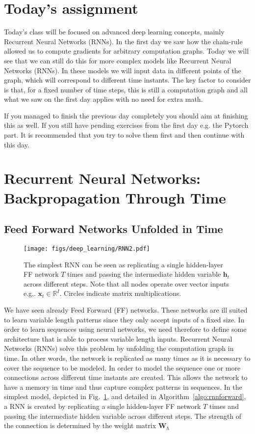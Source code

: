 \section{Today's assignment}
Today's class will be focused on advanced deep learning concepts, mainly
Recurrent Neural Networks (RNNs). In the first day we saw how the chain-rule
allowed us to compute gradients for arbitrary computation graphs. Today we will
see that we can still do this for more complex models like Recurrent Neural
Networks (RNNs). In these models we will input data in different points of the
graph, which will correspond to different time instants. The key factor to
consider is that, for a fixed number of time steps, this is still a computation
graph and all what we saw on the first day applies with no need for extra math.

If you managed to finish the previous day completely you should aim at finishing
this as well. If you still have pending exercises from the first day e.g. the
Pytorch part. It is recommended that you try to solve them first and then
continue with this day. 

\section{Recurrent Neural Networks: Backpropagation Through Time}

\subsection{Feed Forward Networks Unfolded in Time}

\begin{figure}[!h]
\centering
\texttt{[image: figs/deep\_learning/RNN2.pdf]}
\caption{The simplest RNN can be seen as replicating a single hidden-layer FF
network $T$ times and passing the intermediate hidden variable $\mathbf{h}_t$
across different steps. Note that all nodes operate over vector inputs e.g,.
$\mathbf{x}_t \in \mathbb{R}^I$. Circles indicate matrix multiplications.}
\label{fig:RNN}
\end{figure}

We have seen already Feed Forward (FF) networks. These networks are ill
suited to learn variable length patterns since they only accept inputs of a
fixed size. In order to learn sequences using neural networks, we need therefore
to define some architecture that is able to process variable length inputs.
Recurrent Neural Networks (RNNs) solve this problem by unfolding the
computation graph in time. In other words, the network is replicated as many
times as it is necessary to cover the sequence to be modeled. In order
to model the sequence one or more connections across different time instants are
created. This allows the network to have a memory in time and thus capture
complex patterns in sequences. In the simplest model, depicted in
Fig.~\ref{fig:RNN}, and detailed in Algorithm~\ref{algo:rnnforward}, a RNN is
created by replicating a single hidden-layer FF network $T$ times and passing
the intermediate hidden variable across different steps. The strength of the
connection is determined by the weight matrix $\mathbf{W}_h$

